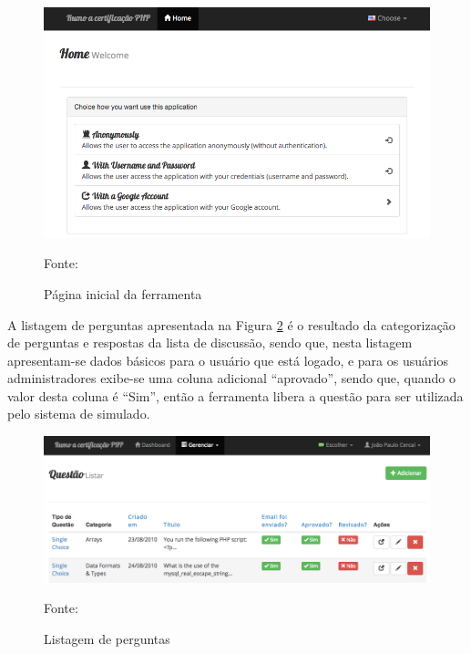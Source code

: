 \begin{figure}[h!tb]
	\caption{Página inicial da ferramenta}
	\label{fig:zcpeHome}

	\centering
	\includegraphics[width=\textwidth]{images/resultados/zcpe-home.png}

	\centering
	\footnotesize Fonte: \fonteOAutor
\end{figure}

\FloatBarrier 	%

A listagem de perguntas apresentada na Figura \ref{fig:zcpePerguntaListagem} é
o resultado da categorização de perguntas e respostas da lista de discussão,
sendo que, nesta listagem apresentam-se dados básicos para o usuário que está logado, e para os usuários
administradores exibe-se uma coluna adicional ``aprovado'', sendo que, quando
o valor desta coluna é ``Sim'', então a ferramenta libera a questão
para ser utilizada pelo sistema de simulado.

\begin{figure}[h!tb]
	\caption{Listagem de perguntas}
	\label{fig:zcpePerguntaListagem}

	\centering
	\includegraphics[width=\textwidth]{images/resultados/zcpe-pergunta-listagem.png}

	\centering
	\footnotesize Fonte: \fonteOAutor
\end{figure}

